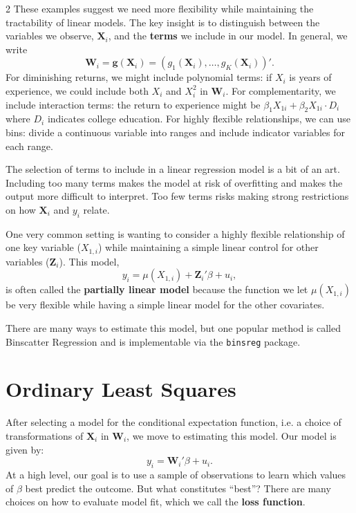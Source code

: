 \documentclass[12pt]{article}
\begin{document}
\begin{multicols}{2}
  These examples suggest we need more flexibility while maintaining the tractability of linear models.
  The key insight is to distinguish between the variables we observe, $\bm{X}_i$, and the \textbf{terms} we include in our model.
  In general, we write
  $$
  \bm{W}_i = \bm{g}(\bm{X}_i) = \left( g_1(\bm{X}_i), \dots, g_K(\bm{X}_i) \right)'.
  $$
  For diminishing returns, we might include polynomial terms: if $X_i$ is years of experience, we could include both $X_i$ and $X_i^2$ in $\bm{W}_i$.
  For complementarity, we include interaction terms: the return to experience might be $\beta_1 X_{1i} + \beta_2 X_{1i} \cdot D_i$ where $D_i$ indicates college education.
  For highly flexible relationships, we can use bins: divide a continuous variable into ranges and include indicator variables for each range.

  The selection of terms to include in a linear regression model is a bit of an art.
  Including too many terms makes the model at risk of overfitting and makes the output more difficult to interpret.
  Too few terms risks making strong restrictions on how $\bm{X}_i$ and $y_i$ relate.

  One very common setting is wanting to consider a highly flexible relationship of one key variable ($X_{1,i}$) while maintaining a simple linear control for other variables ($\bm{Z}_i$).
  This model,
  $$
  y_i = \mu(X_{1,i}) + \bm{Z}_i' \beta + u_i,
  $$
  is often called the \textbf{partially linear model} because the function we let $\mu(X_{1,i})$ be very flexible while having a simple linear model for the other covariates.

  There are many ways to estimate this model, but one popular method is called Binscatter Regression and is implementable via the \texttt{binsreg} package.

  \section*{Ordinary Least Squares}

  After selecting a model for the conditional expectation function, i.e. a choice of transformations of $\bm{X}_i$ in $\bm{W}_i$, we move to estimating this model.
  Our model is given by:
  $$
  y_i = \bm{W}_i' \beta + u_i.
  $$
  At a high level, our goal is to use a sample of observations to learn which values of $\beta$ best predict the outcome.
  But what constitutes ``best''?
  There are many choices on how to evaluate model fit, which we call the \textbf{loss function}.


\end{multicols}
\end{document}

